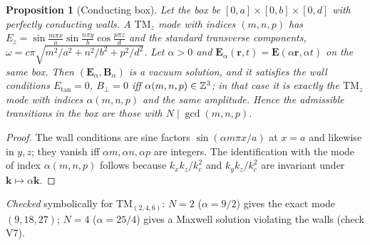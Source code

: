 \documentclass[11pt,a4paper]{article}
\newtheorem{proposition}[theorem]{Proposition}
\theoremstyle{definition}
\theoremstyle{remark}
\newcommand{\bE}{\mathbf E}\newcommand{\bB}{\mathbf B}
\begin{document}
\begin{proposition}[Conducting box]\label{prop:box}
Let the box be $[0,a]\times[0,b]\times[0,d]$ with perfectly conducting walls. A $\mathrm{TM}_z$ mode with indices $(m,n,p)$ has $E_z=\sin\tfrac{m\pi x}a\sin\tfrac{n\pi y}b\cos\tfrac{p\pi z}d$ and the standard transverse components, $\omega=c\pi\sqrt{m^2/a^2+n^2/b^2+p^2/d^2}$. Let $\alpha>0$ and $\bE_\alpha(\mathbf r,t)=\bE(\alpha\mathbf r,\alpha t)$ on the same box. Then $(\bE_\alpha,\bB_\alpha)$ is a vacuum solution, and it satisfies the wall conditions $E_{\tan}=0$, $B_\perp=0$ iff $\alpha(m,n,p)\in\mathbb Z^3$; in that case it is exactly the $\mathrm{TM}_z$ mode with indices $\alpha(m,n,p)$ and the same amplitude. Hence the admissible transitions in the box are those with $N\mid\gcd(m,n,p)$.
\end{proposition}
\begin{proof}
The wall conditions are sine factors $\sin(\alpha m\pi x/a)$ at $x=a$ and likewise in $y,z$; they vanish iff $\alpha m,\alpha n,\alpha p$ are integers. The identification with the mode of index $\alpha(m,n,p)$ follows because $k_xk_z/k_c^2$ and $k_yk_z/k_c^2$ are invariant under $\mathbf k\mapsto\alpha\mathbf k$.
\end{proof}
\emph{Checked} symbolically for $\mathrm{TM}_{(2,4,6)}$: $N=2$ ($\alpha=9/2$) gives the exact mode $(9,18,27)$; $N=4$ ($\alpha=25/4$) gives a Maxwell solution violating the walls (check V7).

\end{document}
